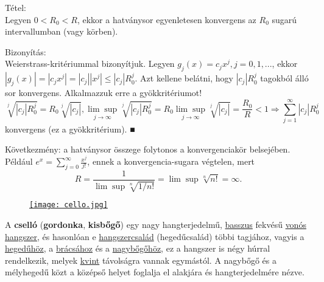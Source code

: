 \documentclass[12pt,a4paper]{scrartcl}
\newenvironment{tetel}{}{}
\newenvironment{bizonyitas}{}{}
\newenvironment{ajanlofig}{\begin{figure}\begin{center}}{
\end{center}\end{figure}}
\begin{document}
\begin{tetel}

Tétel:\\
Legyen \(0 < R_{0} < R\), ekkor a hatványsor egyenletesen konvergens az
\(R_{0}\) sugarú intervallumban (vagy körben).

\end{tetel}

\begin{bizonyitas}

Bizonyítás:\\
Weierstrass-kritériummal bizonyítjuk. Legyen
\(g_{j}\left( x \right) = c_{j}x^{j},j = 0,1,...\), ekkor
\(\left| {g_{j}\left( x \right)} \right| = \left| {c_{j}x^{j}} \right| = \left| c_{j} \right|\left| x^{j} \right| \leq \left| c_{j} \right|R_{0}^{j}\).
Azt kellene belátni, hogy \(\left| c_{j} \right|R_{0}^{j}\) tagokból
álló sor konvergens. Alkalmazzuk erre a gyökkritériumot!
\[\left. \sqrt[j]{\left| c_{j} \right|R_{0}^{j}} = R_{0}\sqrt[j]{\left| c_{j} \right|},\underset{j\rightarrow\infty}{\lim\sup}\sqrt[j]{\left| c_{j} \right|R_{0}^{j}} = R_{0}\underset{j\rightarrow\infty}{\lim\sup}\sqrt[j]{\left| c_{j} \right|} = \frac{R_{0}}{R} < 1\Rightarrow{\sum\limits_{j = 1}^{\infty}{\left| c_{j} \right|R_{0}^{j}}} \right.\]
konvergens (ez a gyökkritérium). ■

\end{bizonyitas}

Következmény: a hatványsor összege folytonos a konvergenciakör
belsejében. Például
\(e^{x} = {\sum\limits_{j = 0}^{\infty}\frac{x^{j}}{j!}}\), ennek a
konvergencia-sugara végtelen, mert
\[{R = \frac{1}{\lim\sup\sqrt[n]{1/n!}} = \lim\sup\sqrt[n]{n!} = \infty}.\]

\begin{ajanlo}

\begin{ajanlofig}

\href{https://hu.wikipedia.org/wiki/Csell\%C3\%B3}{\texttt{[image: cello.jpg]}}

\end{ajanlofig}

A \textbf{cselló} (\textbf{gordonka}, \textbf{kisbőgő}) egy nagy
hangterjedelmű, \href{https://hu.wikipedia.org/wiki/Basszus}{basszus}
fekvésű
\href{https://hu.wikipedia.org/wiki/Von\%C3\%B3s_hangszerek}{vonós}
\href{https://hu.wikipedia.org/wiki/Hangszer}{hangszer}, és hasonlóan e
\href{https://hu.wikipedia.org/wiki/Hangszercsal\%C3\%A1d}{hangszercsalád}
(hegedűcsalád) többi tagjához, vagyis a
\href{https://hu.wikipedia.org/wiki/Heged\%C5\%B1}{hegedűhöz}, a
\href{https://hu.wikipedia.org/wiki/Br\%C3\%A1csa}{brácsához} és a
\href{https://hu.wikipedia.org/wiki/Nagyb\%C5\%91g\%C5\%91}{nagybőgőhöz},
ez a hangszer is négy húrral rendelkezik, melyek
\href{https://hu.wikipedia.org/wiki/Kvint}{kvint} távolságra vannak
egymástól. A nagybőgő és a mélyhegedű közt a középső helyet foglalja el
alakjára és hangterjedelmére nézve.

\end{ajanlo}
\end{document}
